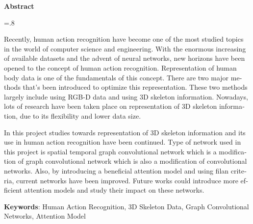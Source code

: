 


\pagestyle{empty}

\begin{latin}

\begin{center}
\textbf{Abstract}
\end{center}
\baselineskip=.8\baselineskip

Recently, human action recognition have become one of the most studied topics in the world of computer science and engineering. With the enormous increasing of available datasets and the advent of neural networks, new horizons have been opened to the concept of human action recognition.  Representation of human body data is one of the fundamentals of this concept. There are two major methods that’s been introduced to optimize this representation. These two methods largely include using RGB-D data and using 3D skeleton information. Nowadays, lots of research have been taken place on representation of 3D skeleton information, due to its flexibility and lower data size. 

In this project studies towards representation of 3D skeleton information and its use in human action recognition have been continued. Type of network used in this project is spatial temporal graph convolutional network which is a modification of graph convolutional network which is also a modification of convolutional networks. Also, by introducing a beneficial attention model and using filan criteria, current networks have been improved. Future works could introduce more efficient attention models and study their impact on these networks. 

\bigskip\noindent\textbf{Keywords}:
Human Action Recognition, 3D Skeleton Data, Graph Convolutional Networks, Attention Model 

\end{latin}

\newpage
